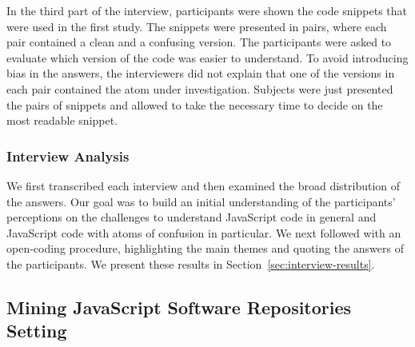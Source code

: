 In the third part of the interview, participants were shown the code snippets that were used in the first study. The snippets were presented in pairs, where each pair contained a clean and a confusing version. The participants 
were asked to evaluate which version of the code was easier to understand. To avoid introducing bias in the answers, the interviewers did not explain that one of the versions in each pair contained the atom under investigation. Subjects were just presented the pairs of snippets and allowed to take the necessary time to decide on the most readable snippet.

\subsubsection*{Interview Analysis}

We first transcribed each interview and then examined the broad distribution of the answers. Our goal was to build an initial understanding of the participants' perceptions on the challenges to understand JavaScript code in general and JavaScript code with atoms of confusion in particular. We next followed with an open-coding procedure, highlighting the main themes and quoting the answers of the participants. We present these results in Section~\ref{sec:interview-results}. 




\subsection{Mining JavaScript Software Repositories Setting}


